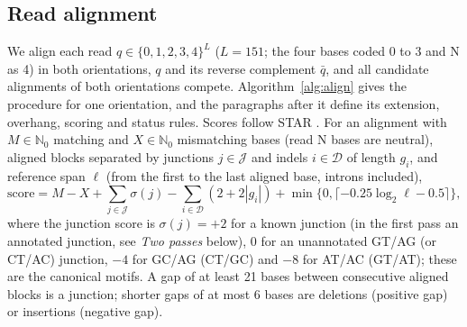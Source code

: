 \documentclass[11pt]{article}
\begin{document}
\subsection{Read alignment}

We align each read $q\in\{0,1,2,3,4\}^L$ ($L=151$; the four bases coded 0 to 3 and N as 4) in both orientations, $q$ and its reverse complement $\bar q$, and all candidate alignments of both orientations compete. Algorithm~\ref{alg:align} gives the procedure for one orientation, and the paragraphs after it define its extension, overhang, scoring and status rules. Scores follow STAR \cite{dobin2013}. For an alignment with $M\in\mathbb N_0$ matching and $X\in\mathbb N_0$ mismatching bases (read N bases are neutral), aligned blocks separated by junctions $j\in\mathcal J$ and indels $i\in\mathcal D$ of length $g_i$, and reference span $\ell$ (from the first to the last aligned base, introns included), \[\mathrm{score}=M-X+\sum_{j\in\mathcal J}\sigma(j)-\sum_{i\in\mathcal D}(2+2|g_i|)+\min\{0,\lceil-0.25\log_2\ell-0.5\rceil\},\] where the junction score is $\sigma(j)=+2$ for a known junction (in the first pass an annotated junction, see \emph{Two passes} below), $0$ for an unannotated GT/AG (or CT/AC) junction, $-4$ for GC/AG (CT/GC) and $-8$ for AT/AC (GT/AT); these are the canonical motifs. A gap of at least 21 bases between consecutive aligned blocks is a junction; shorter gaps of at most 6 bases are deletions (positive gap) or insertions (negative gap).
\end{document}
